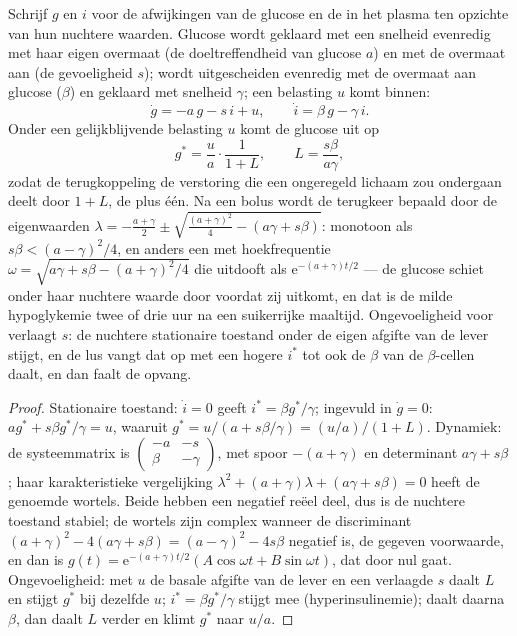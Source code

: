 \begin{theorem}\label{thm:b3:endocrinology:loop}
Schrijf $g$ en $i$ voor de afwijkingen van de glucose en de  in
het plasma ten opzichte van hun nuchtere waarden. Glucose wordt
geklaard met een snelheid evenredig met haar eigen overmaat (de
doeltreffendheid van glucose $a$) en met de overmaat aan  (de
gevoeligheid $s$);  wordt uitgescheiden evenredig met de
overmaat aan glucose ($\beta$) en geklaard met snelheid $\gamma$; een
belasting $u$ komt binnen:
\[
\dot g = -a\,g - s\,i + u, \qquad \dot i = \beta\,g - \gamma\,i .
\]
Onder een gelijkblijvende belasting $u$ komt de glucose uit op
\[
g^{*} = \frac{u}{a}\cdot\frac{1}{1 + L}, \qquad L = \frac{s\beta}{a\gamma},
\]
zodat de terugkoppeling de verstoring die een ongeregeld lichaam zou
ondergaan deelt door $1 + L$, de \emph{} plus één. Na een
bolus wordt de terugkeer bepaald door de eigenwaarden
$\lambda = -\tfrac{a + \gamma}{2} \pm \sqrt{\tfrac{(a+\gamma)^{2}}{4} - (a\gamma + s\beta)}$:
monotoon als $s\beta < (a - \gamma)^{2}/4$, en anders een  met hoekfrequentie $\omega = \sqrt{a\gamma + s\beta -
(a+\gamma)^{2}/4}$ die uitdooft als $\mathrm{e}^{-(a+\gamma)t/2}$ --- de
glucose schiet onder haar nuchtere waarde door voordat zij uitkomt, en
dat is de milde hypoglykemie twee of drie uur na een suikerrijke
maaltijd. Ongevoeligheid voor  verlaagt $s$: de nuchtere
stationaire toestand onder de eigen afgifte van de lever stijgt, en de
lus vangt dat op met een hogere $i^{*}$ tot ook de $\beta$ van de
$\beta$-cellen daalt, en dan faalt de opvang.
\end{theorem}
\begin{proof}
Stationaire toestand: $\dot i = 0$ geeft $i^{*} = \beta g^{*}/\gamma$;
ingevuld in $\dot g = 0$: $a g^{*} + s\beta g^{*}/\gamma = u$, waaruit $g^{*} =
u/(a + s\beta/\gamma) = (u/a)/(1 + L)$. Dynamiek: de systeemmatrix is
$\begin{pmatrix} -a & -s\\ \beta & -\gamma\end{pmatrix}$, met spoor
$-(a+\gamma)$ en determinant $a\gamma + s\beta$; haar karakteristieke
vergelijking $\lambda^{2} + (a+\gamma)\lambda + (a\gamma + s\beta) = 0$ heeft
de genoemde wortels. Beide hebben een negatief reëel deel, dus is de
nuchtere toestand stabiel; de wortels zijn complex wanneer de
discriminant $(a+\gamma)^{2}
- 4(a\gamma + s\beta) = (a-\gamma)^{2} - 4s\beta$ negatief is, de
gegeven voorwaarde, en dan is $g(t) = \mathrm{e}^{-(a+\gamma)t/2}(A\cos\omega t
+ B\sin\omega t)$, dat door nul gaat. Ongevoeligheid: met $u$ de basale
afgifte van de lever en een verlaagde $s$ daalt $L$ en stijgt $g^{*}$
bij dezelfde $u$; $i^{*} = \beta g^{*}/\gamma$ stijgt mee
(hyperinsulinemie); daalt daarna $\beta$, dan daalt $L$ verder en klimt $g^{*}$ naar $u/a$.
\end{proof}


